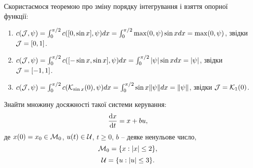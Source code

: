 \begin{solution}
    Скористаємося теоремою про зміну порядку інтегрування і взяття опорної функції:
    \begin{enumerate}
        \item $c(\mathcal{J}, \psi) = \int_0^{\pi/2} c([0, \sin x], \psi) dx = \int_0^{\pi/2} \max(0, \psi) \sin x dx = \max(0, \psi)$, звідки $\mathcal{J} = [0, 1]$.
        \item $c(\mathcal{J}, \psi) = \int_0^{\pi/2} c([-\sin x, \sin x], \psi) dx = \int_0^{\pi/2} |\psi| \sin x dx = |\psi|$, звідки $\mathcal{J} = [-1, 1]$.
        \item $c(\mathcal{J}, \psi) = \int_0^{\pi/2} c(\mathcal{K}_{\sin x}(0), \psi) dx = \int_0^{\pi/2} \sin x \|\psi\| dx = \|\psi\|$, звідки $\mathcal{J} = \mathcal{K}_1(0)$. 
    \end{enumerate}
\end{solution}

\begin{problem}
    Знайти множину досяжності такої системи керування:
    \[\frac{\mathop{}\!\mathrm{d} x}{\mathop{}\!\mathrm{d} t} = x + bu,\] 
    де $x(0) = x_0 \in \mathcal{M}_0$, $u(t)\in \mathcal{U}$, $t\ge0$, $b$ -- деяке ненульове число, 
    \[ \mathcal{M}_0 = \{ x : | x | \le 2 \}, \]
    \[ \mathcal{U} = \{ u : |u| \le 3 \}. \]
\end{problem}

